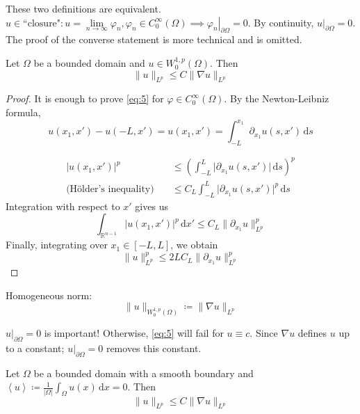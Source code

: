 \documentclass{report}
\begin{document}
\mlemma{}
{
    These two definitions are equivalent. \(u \in \text{``closure"} \colon u = \lim\limits_{n \to \infty} \varphi_{n}, \varphi_{n} \in C^{\infty}_{0}(\Omega) \implies \left. \varphi_{n} \right|_{\partial \Omega} = 0\). By continuity, \(\left. u \right|_{\partial \Omega} = 0\). The proof of the converse statement is more technical and is omitted.
}

{
    Let \(\Omega\) be a bounded domain and \(u \in W^{1, p}_{0}(\Omega)\). Then
    \begin{equation}\label{eq:5}
        \|u\|_{L^{p}} \leq C \|\nabla u\|_{L^{p}} 
    \end{equation}
}

\begin{proof}
    It is enough to prove \ref{eq:5} for \(\varphi \in C^{\infty}_{0}(\Omega)\). By the Newton-Leibniz formula,      
    \[    
        u(x_1, x') - u(-L, x') = u(x_1, x') = \int_{-L}^{x_1} \partial_{x_1}u(s, x') \,\mathrm{d}s 
    \] 

    \begin{align*}
        \vert u(x_1, x') \vert ^{p} &\leq \left(\int_{-L}^{L} \vert \partial_{x_1}u(s, x') \vert \,\mathrm{d}s \right)^{p} \\
        \text{(Hölder's inequality)} \quad & \leq C_{L} \int_{-L}^{L} \vert \partial_{x_1}u(s, x') \vert^{p} \,\mathrm{d}s
    \end{align*}
    Integration with respect to $x'$ gives us
    \[
        \int_{\mathbb{R}^{n-1}} \vert u(x_1, x') \vert ^{p} \,\mathrm{d}x' \leq C_{L}\|\partial_{x_1}u\|_{L^{p}}^{p}
    \]
    Finally, integrating over \(x_1 \in [-L, L]\), we obtain
    \[
        \|u\|_{L^{p}}^{p} \leq 2LC_{L} \|\partial_{x_1}u\|_{L^{p}}^{p}
    \]
\end{proof}

{
    Homogeneous norm:
    \[
        \|u\|_{W^{1, p}_{0}(\Omega)} \coloneqq \|\nabla u\|_{L^{p}}
    \]
}

\begin{note}
    \(\left. u \right|_{\partial \Omega} = 0\) is important! Otherwise, \ref{eq:5} will fail for \(u \equiv c\). Since \(\nabla u\) defines \(u\) up to a constant; \(\left. u \right|_{\partial \Omega} = 0\) removes this constant.  
\end{note}

{
    Let \(\Omega\) be a bounded domain with a smooth boundary and \(\left\langle u \right\rangle \coloneqq \frac{1}{\vert \Omega \vert } \int_{\Omega} u(x) \,\mathrm{d}x = 0\). Then 
    \[
        \|u\|_{L^{p}} \leq C \|\nabla u\|_{L^{p}}  
    \]   
}
\end{document}

